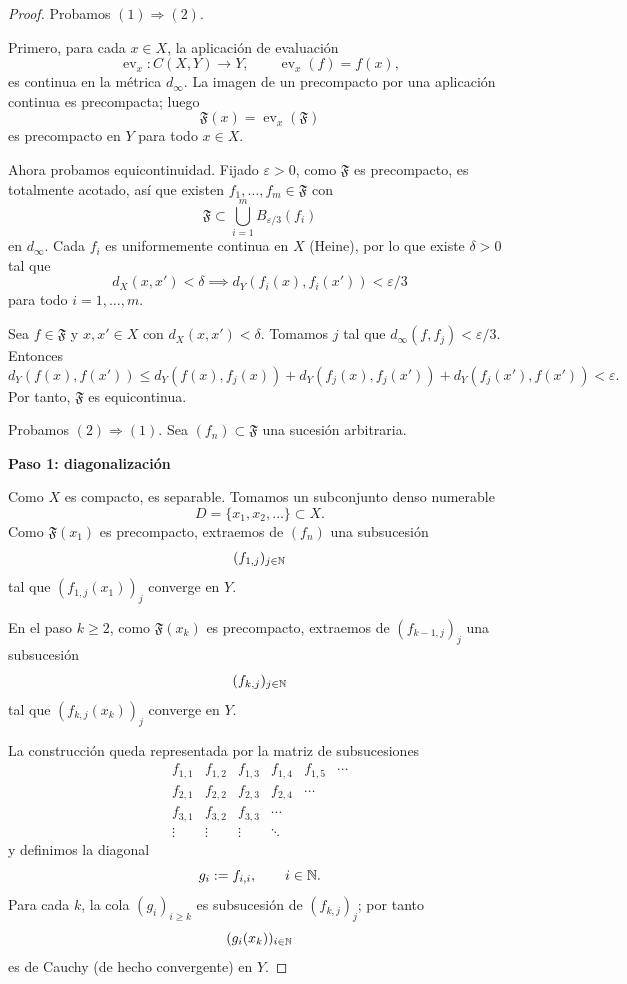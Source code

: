 \begin{proof}
Probamos $(1)\Rightarrow(2)$.

Primero, para cada $x\in X$, la aplicación de evaluación
\[
\operatorname{ev}_x:C(X,Y)\to Y,\qquad \operatorname{ev}_x(f)=f(x),
\]
es continua en la métrica $d_\infty$. La imagen de un precompacto por una aplicación continua es precompacta; luego
\[
\mathfrak{F}(x)=\operatorname{ev}_x(\mathfrak{F})
\]
es precompacto en $Y$ para todo $x\in X$.

Ahora probamos equicontinuidad. Fijado $\varepsilon>0$, como $\mathfrak{F}$ es precompacto, es totalmente acotado, así que existen
$f_1,\dots,f_m\in\mathfrak{F}$ con
\[
\mathfrak{F}\subset\bigcup_{i=1}^m B_{\varepsilon/3}(f_i)
\]
en $d_\infty$.
Cada $f_i$ es uniformemente continua en $X$ (Heine), por lo que existe $\delta>0$ tal que
\[
d_X(x,x')<\delta \implies d_Y(f_i(x),f_i(x'))<\varepsilon/3
\]
para todo $i=1,\dots,m$.

Sea $f\in\mathfrak{F}$ y $x,x'\in X$ con $d_X(x,x')<\delta$. Tomamos $j$ tal que
$d_\infty(f,f_j)<\varepsilon/3$. Entonces
\[
d_Y(f(x),f(x'))
\le d_Y(f(x),f_j(x))+d_Y(f_j(x),f_j(x'))+d_Y(f_j(x'),f(x'))
<\varepsilon.
\]
Por tanto, $\mathfrak{F}$ es equicontinua.

Probamos $(2)\Rightarrow(1)$.
Sea $(f_n)\subset\mathfrak{F}$ una sucesión arbitraria.

\textbf{Paso 1: diagonalización}

Como $X$ es compacto, es separable. Tomamos un subconjunto denso numerable
\[
D=\{x_1,x_2,\dots\}\subset X.
\]
Como $\mathfrak{F}(x_1)$ es precompacto, extraemos de $(f_n)$ una subsucesión
\[
(f_{1,j})_{j\in\mathbb{N}}
\]
tal que $(f_{1,j}(x_1))_j$ converge en $Y$.

En el paso $k\ge 2$, como $\mathfrak{F}(x_k)$ es precompacto, extraemos de
$(f_{k-1,j})_j$ una subsucesión
\[
(f_{k,j})_{j\in\mathbb{N}}
\]
tal que $(f_{k,j}(x_k))_j$ converge en $Y$.

La construcción queda representada por la matriz de subsucesiones
\[
\begin{array}{cccccc}
f_{1,1} & f_{1,2} & f_{1,3} & f_{1,4} & f_{1,5} & \cdots \\
f_{2,1} & f_{2,2} & f_{2,3} & f_{2,4} & \cdots \\
f_{3,1} & f_{3,2} & f_{3,3} & \cdots \\
\vdots & \vdots & \vdots & \ddots
\end{array}
\]
y definimos la diagonal
\[
g_i:=f_{i,i},\qquad i\in\mathbb{N}.
\]
Para cada $k$, la cola $(g_i)_{i\ge k}$ es subsucesión de $(f_{k,j})_j$; por tanto
\[
(g_i(x_k))_{i\in\mathbb{N}}
\]
es de Cauchy (de hecho convergente) en $Y$.


\end{proof}
